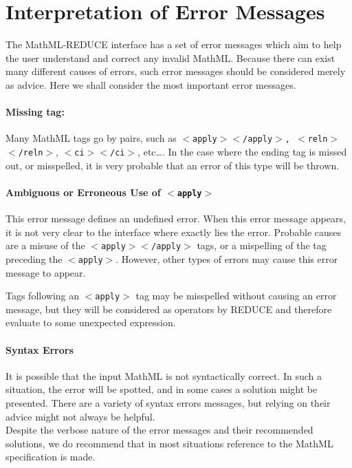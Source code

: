 \documentclass{article}
\begin{document}
\section{Interpretation of Error Messages}

The MathML-REDUCE interface has a set of error messages which aim to help the
user understand and correct any invalid MathML. Because there can exist many
different causes of errors, such error messages should be considered merely
as advice. Here we shall consider the most important error messages.

\paragraph{Missing tag:}

Many MathML tags go by pairs, such as {\tt $<$apply$>$$<$/apply$>$,
$<$reln$>$$<$/reln$>$}, {\tt $<$ci$>$$<$/ci$>$}, etc\ldots. In the
case
where the ending tag is missed out, or misspelled, it is very probable that an
error of this type will be thrown. 

\paragraph{Ambiguous or Erroneous Use of {\tt $<$apply$>$}}

This error message defines an undefined error. When this error message
appears, it is not very clear to the interface where exactly lies the error. 
Probable causes are a misuse of the {\tt $<$apply$>$$<$/apply$>$} tags, or a
mispelling of the tag preceding the {\tt $<$apply$>$}. However, other types
of errors may cause this error message to appear. 

Tags following an {\tt $<$apply$>$} tag may be misspelled without causing an
error message, but they will be considered as operators by REDUCE and
therefore evaluate to some unexpected expression.

\paragraph{Syntax Errors}

It is possible that the input MathML is not syntactically correct. In such
a situation, the error will be spotted, and in some cases a solution might be
presented. There are a variety of syntax errors messages, but relying on
their advice might not always be helpful. 
\\

Despite the verbose nature of the error messages and their recommended
solutions, we do recommend that in most situations reference to the MathML
specification is made. 
\end{document}
